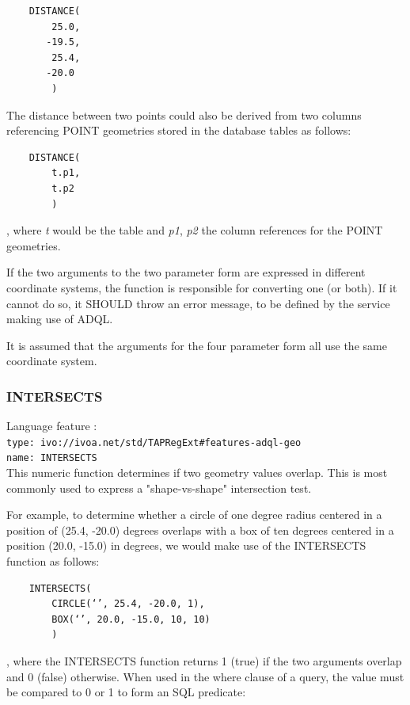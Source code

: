 \documentclass[11pt,a4paper]{ivoa}
\begin{document}
\begin{verbatim}
    DISTANCE(
        25.0,
       -19.5,
        25.4,
       -20.0
        )
\end{verbatim}

The distance between two points could also be derived from two columns
referencing POINT geometries stored in the database tables as follows:

\begin{verbatim}
    DISTANCE(
        t.p1,
        t.p2
        )
\end{verbatim}

, where \textit{t} would be the table and \textit{p1}, \textit{p2} the column
references for the POINT geometries.

If the two arguments to the two parameter form are expressed in different
coordinate systems, the function is responsible for converting one (or both).
If it cannot do so, it SHOULD throw an error message, to be defined by
the service making use of ADQL.

It is assumed that the arguments for the four parameter form all use
the same coordinate system.

\subsubsection{INTERSECTS}
\label{sec:functions.geom.intersects}
{\footnotesize Language feature :}\\
{\footnotesize \verb|type: ivo://ivoa.net/std/TAPRegExt#features-adql-geo|}\\
{\footnotesize \verb|name: INTERSECTS|}\\

This numeric function determines if two geometry values overlap. This is
most commonly used to express a "shape-vs-shape" intersection test.

For example, to determine whether a circle of one degree radius centered
in a position of (25.4, -20.0) degrees overlaps with a box of ten degrees
centered in a position (20.0, -15.0) in degrees, we would make use of the
INTERSECTS function as follows:

\begin{verbatim}
    INTERSECTS(
        CIRCLE(‘’, 25.4, -20.0, 1),
        BOX(‘’, 20.0, -15.0, 10, 10)
        )
\end{verbatim}

, where the INTERSECTS function returns 1 (true) if the two arguments overlap
and 0 (false) otherwise. When used in the where clause of a query, the value
must be compared to 0 or 1 to form an SQL predicate:
\end{document}
